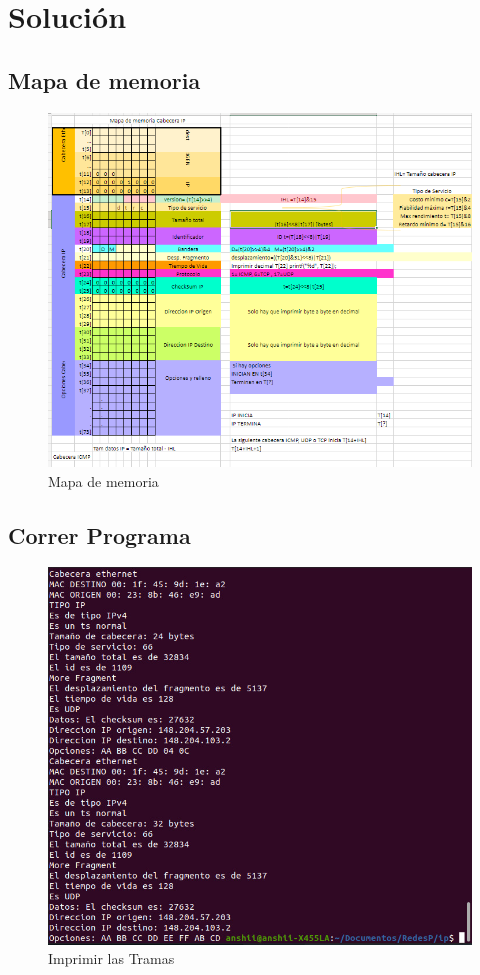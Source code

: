 \section{Soluci\'on}
	\setlength{\parindent}{1em}
	\setlength{\parskip}{10pt}
	\subsection{Mapa de memoria}
		\begin{figure}[h]
			\centering		
			\includegraphics[width=\textwidth]{MapaMemoria}
			\caption{Mapa de memoria}
		\end{figure}
\subsection{Correr Programa}
		\begin{figure}[h]
			\centering		
			\includegraphics[width=\textwidth]{Resultado}
			\caption{Imprimir las Tramas}
		\end{figure}
\clearpage
